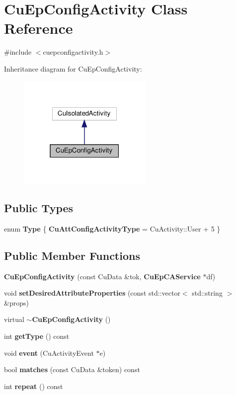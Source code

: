 \section{Cu\+Ep\+Config\+Activity Class Reference}
\label{classCuEpConfigActivity}


{\ttfamily \#include $<$cuepconfigactivity.\+h$>$}



Inheritance diagram for Cu\+Ep\+Config\+Activity\+:\nopagebreak
\begin{figure}[H]
\begin{center}
\leavevmode
\includegraphics[width=183pt]{classCuEpConfigActivity__inherit__graph}
\end{center}
\end{figure}
\subsection*{Public Types}
\begin{DoxyCompactItemize}
\item 
enum \textbf{ Type} \{ \textbf{ Cu\+Att\+Config\+Activity\+Type} = Cu\+Activity\+:\+:User + 5
 \}
\end{DoxyCompactItemize}
\subsection*{Public Member Functions}
\begin{DoxyCompactItemize}
\item 
\textbf{ Cu\+Ep\+Config\+Activity} (const Cu\+Data \&tok, \textbf{ Cu\+Ep\+C\+A\+Service} $\ast$df)
\item 
void \textbf{ set\+Desired\+Attribute\+Properties} (const std\+::vector$<$ std\+::string $>$ \&props)
\item 
virtual \textbf{ $\sim$\+Cu\+Ep\+Config\+Activity} ()
\item 
int \textbf{ get\+Type} () const
\item 
void \textbf{ event} (Cu\+Activity\+Event $\ast$e)
\item 
bool \textbf{ matches} (const Cu\+Data \&token) const
\item 
int \textbf{ repeat} () const
\end{DoxyCompactItemize}
